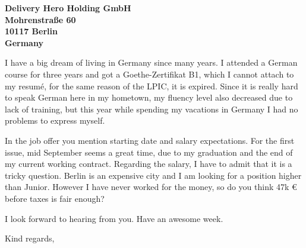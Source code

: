 \documentclass[a4paper]{willianpaixao-letter}
\begin{document}
\begin{letter}{\bfseries
Delivery Hero Holding GmbH\\Mohrenstraße 60\\10117 Berlin\\Germany}

I have a big dream of living in Germany since many years. I attended a German
course for three years and got a Goethe-Zertifikat B1, which I cannot attach to
my resumé, for the same reason of the LPIC, it is expired. Since it is really
hard to speak German here in my hometown, my fluency level also decreased due to
lack of training, but this year while spending my vacations in Germany I had no
problems to express myself.

In the job offer you mention starting date and salary expectations. For the
first issue, mid September seems a great time, due to my graduation and the end
of my current working contract. Regarding the salary, I have to admit that it is
a tricky question. Berlin is an expensive city and I am looking for a position
higher than Junior. However I have never worked for the money, so do you think
47k € before taxes is fair enough?

I look forward to hearing from you. Have an awesome week.
\closing{Kind regards,}
\end{letter}
\end{document}
